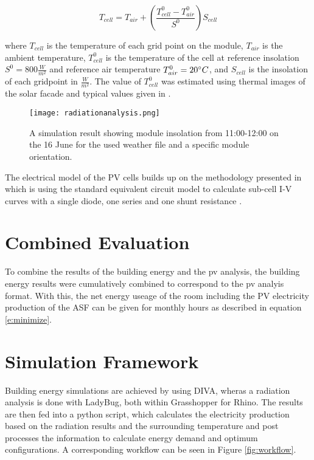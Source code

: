 		\begin{equation}
			T_{cell} = T_{air} + \left(\frac{T_{cell}^0-T_{air}^0}{S^0}\right)S_{cell}
      		\label{e:temp}
		\end{equation}

		where $T_{cell}$ is the temperature of each grid point on the module, $T_{air}$ is the ambient temperature, $T_{cell}^0$ is the temperature of the cell at reference insolation $S^0=800\frac{W}{m^2}$ and reference air temperature $T_{air}^0=20\degree C$, and $S_{cell}$ is the insolation of each gridpoint in $\frac{W}{m^2}$. The value of $T_{cell}^0$ was estimated using thermal images of the solar facade and typical values given in \cite{Ross_Smokler_1986}. 

		\begin{figure}[H]
		\begin{center}
			\texttt{[image: radiationanalysis.png]}
			\caption{A simulation result showing module insolation from 11:00-12:00 on the 16 June for the used weather file and a specific module orientation.}
			\label{fig:radiation}
		\end{center}
		\end{figure}

		The electrical model of the PV cells builds up on the methodology presented in \cite{hofer2015PVSEC} which is using the standard equivalent circuit model to calculate sub-cell I-V curves with a single diode, one series and one shunt resistance \cite{mermoud2010}. 

	\section{Combined Evaluation}
		To combine the results of the building energy and the pv analysis, the building energy results were cumulatively combined to correspond to the pv analyis format. With this, the net energy useage of the room including the PV electricity production of the ASF can be given for monthly hours as described in equation \ref{e:minimize}. 

	\section{Simulation Framework}
		Building energy simulations are achieved by using DIVA, wheras a radiation analysis is done with LadyBug, both within Grasshopper for Rhino. The results are then fed into a python script, which calculates the electricity production based on the radiation results and the surrounding temperature and post processes the information to calculate energy demand and optimum configurations. A corresponding workflow can be seen in Figure \ref{fig:workflow}. 

